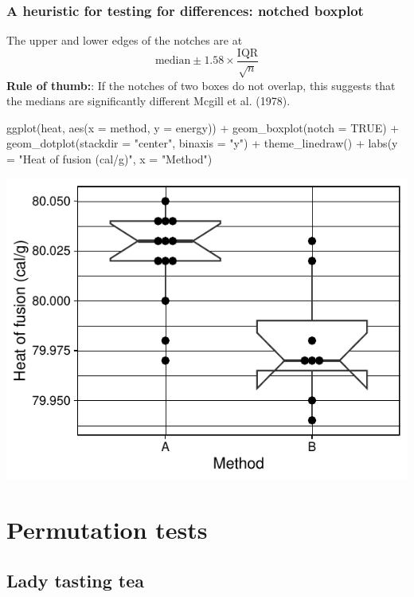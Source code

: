 \documentclass[a4paper]{article}
\begin{document}
\subsubsection{A heuristic for testing for differences: notched boxplot}
The upper and lower edges of the notches are at
\[
	\text{median} \pm 1.58 \times \frac{\text{IQR}}{\sqrt{n}}
\]
\textcolor{mygreen}{\textbf{Rule of thumb:}}: If the notches of two boxes do not overlap, this suggests that the medians are significantly different Mcgill et al. (1978).
\begin{Schunk}
\begin{Sinput}
ggplot(heat, aes(x = method, y = energy)) + 
geom_boxplot(notch = TRUE) + 
geom_dotplot(stackdir = "center",
	    	 binaxis = "y") +
theme_linedraw() + 
labs(y = "Heat of fusion (cal/g)",
     x = "Method")
\end{Sinput}


{\centering \includegraphics[width=\maxwidth]{figure/listings-unnamed-chunk-129-1} 

}

\end{Schunk}

\section{Permutation tests}\label{sec:16}
\subsection{Lady tasting tea}
\end{document}
